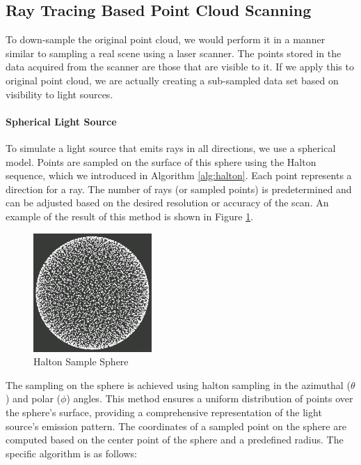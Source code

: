 \documentclass[11pt, a4paper,oneside,chapterprefix=false]{scrbook}
\begin{document}
\subsection{Ray Tracing Based Point Cloud Scanning} \label{sec:ray tracing point cloud scanning}

To down-sample the original point cloud, we would perform it in a manner similar to sampling a real scene using a laser scanner. The points stored in the data acquired from the scanner are those that are visible to it. If we apply this to original point cloud, we are actually creating a sub-sampled data set based on visibility to light sources. 

\paragraph{Spherical Light Source}

To simulate a light source that emits rays in all directions, we use a spherical model. Points are sampled on the surface of this sphere using the Halton sequence, which we introduced in Algorithm \ref{alg:halton}. Each point represents a direction for a ray. The number of rays (or sampled points) is predetermined and can be adjusted based on the desired resolution or accuracy of the scan. An example of the result of this method is shown in Figure \ref{fig:halton sample sphere}.

\begin{figure}[H]
    \centering
    \includegraphics*[width=0.4\textwidth]{figures/halton sample sphere.png}
    \caption{Halton Sample Sphere}
    \label{fig:halton sample sphere}
\end{figure}

The sampling on the sphere is achieved using halton sampling in the azimuthal (\( \theta \)) and polar (\( \phi \)) angles. This method ensures a uniform distribution of points over the sphere's surface, providing a comprehensive representation of the light source's emission pattern. The coordinates of a sampled point on the sphere are computed based on the center point of the sphere and a predefined radius. The specific algorithm is as follows:
\end{document}
